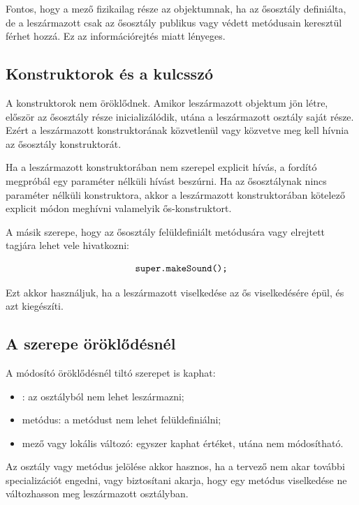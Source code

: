 Fontos, hogy a  mező fizikailag része az objektumnak, ha az ősosztály definiálta, de a leszármazott csak az ősosztály publikus vagy védett metódusain keresztül férhet hozzá. Ez az információrejtés miatt lényeges.

\subsection{Konstruktorok és a  kulcsszó}

A konstruktorok nem öröklődnek. Amikor leszármazott objektum jön létre, először az ősosztály része inicializálódik, utána a leszármazott osztály saját része. Ezért a leszármazott konstruktorának közvetlenül vagy közvetve meg kell hívnia az ősosztály konstruktorát.

Ha a leszármazott konstruktorában nem szerepel explicit  hívás, a fordító megpróbál egy paraméter nélküli  hívást beszúrni. Ha az ősosztálynak nincs paraméter nélküli konstruktora, akkor a leszármazott konstruktorában kötelező explicit módon meghívni valamelyik ős-konstruktort.

A  másik szerepe, hogy az ősosztály felüldefiniált metódusára vagy elrejtett tagjára lehet vele hivatkozni:

\[
  \texttt{super.makeSound();}
\]

Ezt akkor használjuk, ha a leszármazott viselkedése az ős viselkedésére épül, és azt kiegészíti.

\subsection{A  szerepe öröklődésnél}

A  módosító öröklődésnél tiltó szerepet is kaphat:

\begin{itemize}
  \item {}: az osztályból nem lehet leszármazni;
  \item {} metódus: a metódust nem lehet felüldefiniálni;
  \item {} mező vagy lokális változó: egyszer kaphat értéket, utána nem módosítható.
\end{itemize}

Az osztály vagy metódus  jelölése akkor hasznos, ha a tervező nem akar további specializációt engedni, vagy biztosítani akarja, hogy egy metódus viselkedése ne változhasson meg leszármazott osztályban.

